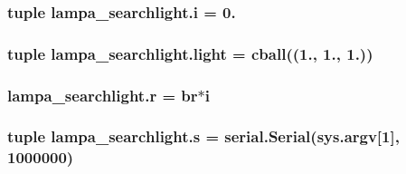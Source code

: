 \subsubsection[{i}]{\setlength{\rightskip}{0pt plus 5cm}tuple lampa\+\_\+searchlight.\+i = 0.}\label{namespacelampa__searchlight_a881b6104fe08478fb089cbccc8114d08}
\hypertarget{namespacelampa__searchlight_a362df79c6f5d43093b80348f0c33870b}{}
\subsubsection[{light}]{\setlength{\rightskip}{0pt plus 5cm}tuple lampa\+\_\+searchlight.\+light = {\bf cball}((1., 1., 1.))}\label{namespacelampa__searchlight_a362df79c6f5d43093b80348f0c33870b}
\hypertarget{namespacelampa__searchlight_aa8857984682eb8ddde904cdd002b8229}{}
\subsubsection[{r}]{\setlength{\rightskip}{0pt plus 5cm}lampa\+\_\+searchlight.\+r = br$\ast${\bf i}}\label{namespacelampa__searchlight_aa8857984682eb8ddde904cdd002b8229}
\hypertarget{namespacelampa__searchlight_ad70257e6ddb7843ea7aed97ce014b04d}{}
\subsubsection[{s}]{\setlength{\rightskip}{0pt plus 5cm}tuple lampa\+\_\+searchlight.\+s = serial.\+Serial(sys.\+argv\mbox{[}1\mbox{]}, 1000000)}\label{namespacelampa__searchlight_ad70257e6ddb7843ea7aed97ce014b04d}
